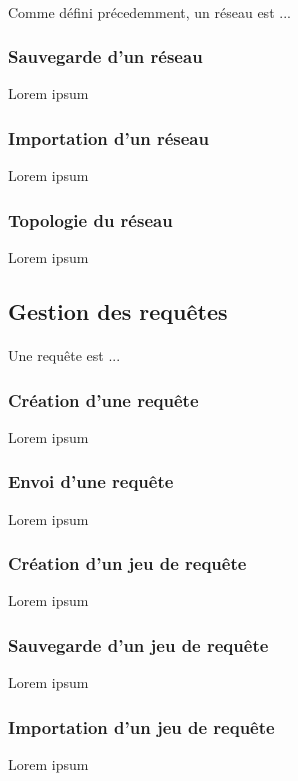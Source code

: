 \documentclass[12pt]{article}
\begin{document}
\paragraph{} Comme défini précedemment, un réseau est ...

\subsubsection{Sauvegarde d'un réseau}
Lorem ipsum

\subsubsection{Importation d'un réseau}
Lorem ipsum

\subsubsection{Topologie du réseau}
Lorem ipsum


\subsection{Gestion des requêtes}

\paragraph{} Une requête est ...

\subsubsection{Création d'une requête}
Lorem ipsum

\subsubsection{Envoi d'une requête}
Lorem ipsum

\subsubsection{Création d'un jeu de requête}
Lorem ipsum

\subsubsection{Sauvegarde d'un jeu de requête}
Lorem ipsum

\subsubsection{Importation d'un jeu de requête}
Lorem ipsum
\end{document}

